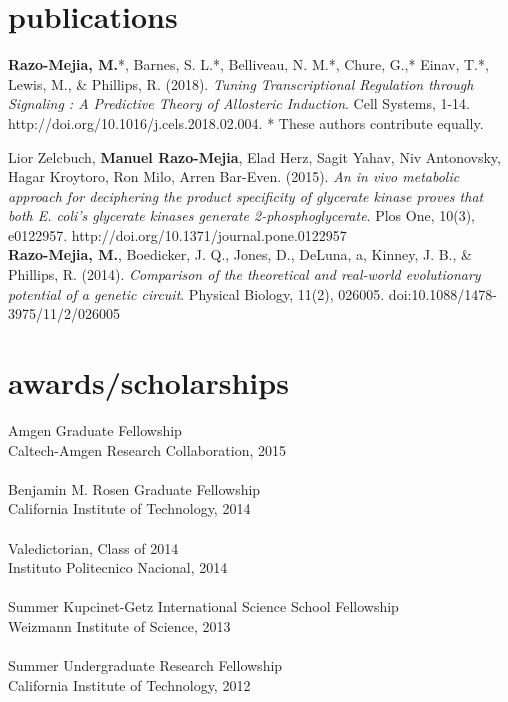 \documentclass[]{friggeri-cv}
\begin{document}
\section{publications}

\textbf{Razo-Mejia, M.}*, Barnes, S. L.*, Belliveau, N. M.*, Chure, G.,* Einav, T.*, Lewis, M., & Phillips, R. (2018). \textit{Tuning Transcriptional Regulation through Signaling : A Predictive Theory of Allosteric Induction}. Cell Systems, 1-14. http://doi.org/10.1016/j.cels.2018.02.004. * These authors contribute equally.

Lior Zelcbuch, \textbf{Manuel Razo-Mejia}, Elad Herz, Sagit Yahav, Niv Antonovsky, Hagar Kroytoro, Ron Milo, Arren Bar-Even. (2015). \textit{An in vivo metabolic approach for deciphering the product specificity of glycerate kinase proves that both E. coli's glycerate kinases generate 2-phosphoglycerate}. Plos One, 10(3), e0122957. http://doi.org/10.1371/journal.pone.0122957\\

\textbf{Razo-Mejia, M.}, Boedicker, J. Q., Jones, D., DeLuna, a, Kinney, J. B., & Phillips, R. (2014). \textit{Comparison of the theoretical and real-world evolutionary potential of a genetic circuit}. Physical Biology, 11(2), 026005. doi:10.1088/1478-3975/11/2/026005\\

\section{awards/scholarships}
Amgen Graduate Fellowship\\
{Caltech-Amgen Research Collaboration, 2015}\\
\\
Benjamin M. Rosen Graduate Fellowship\\
{California Institute of Technology, 2014}\\
\\
Valedictorian, Class of 2014\\
{Instituto Politecnico Nacional, 2014}\\
\\
Summer Kupcinet-Getz International Science School Fellowship\\
{Weizmann Institute of Science, 2013}\\
\\
Summer Undergraduate Research Fellowship\\
{California Institute of Technology, 2012}\\
\end{document}
